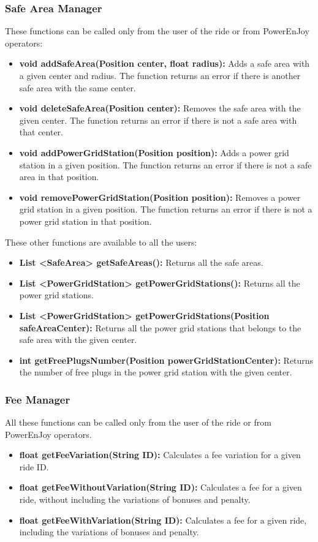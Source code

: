 \subsubsection{Safe Area Manager}
These functions can be called only from the user of the ride or from PowerEnJoy operators:
\begin{itemize}
	\item \textbf{void addSafeArea(Position center, float radius):} Adds a safe area with a given center and radius. The function returns an error if there is another safe area with the same center.
	\item \textbf{void deleteSafeArea(Position center):} Removes the safe area with the given center. The function returns an error if there is not a safe area with that center.
	\item \textbf{void addPowerGridStation(Position position):} Adds a power grid station in a given position. The function returns an error if there is not a safe area in that position.
	\item \textbf{void removePowerGridStation(Position position):} Removes a power grid station in a given position. The function returns an error if there is not a power grid station in that position.
\end{itemize}

These other functions are available to all the users:
\begin{itemize}
	\item \textbf{List \textless SafeArea\textgreater{} getSafeAreas():} Returns all the safe areas.
	\item \textbf{List \textless PowerGridStation\textgreater{} getPowerGridStations():} Returns all the power grid stations.
	\item \textbf{List \textless PowerGridStation\textgreater{} getPowerGridStations(Position safeAreaCenter):} Returns all the power grid stations that belongs to the safe area with the given center.
	\item \textbf{int getFreePlugsNumber(Position powerGridStationCenter):} Returns the number of free plugs in the power grid station with the given center.
\end{itemize}

\subsubsection{Fee Manager}
All these functions can be called only from the user of the ride or from PowerEnJoy operators.
\begin{itemize}
	\item \textbf{float getFeeVariation(String ID):} Calculates a fee variation for a given ride ID. 
	\item \textbf{float getFeeWithoutVariation(String ID):} Calculates a fee for a given ride, without including the variations of bonuses and penalty.
	\item \textbf{float getFeeWithVariation(String ID):} Calculates a fee for a given ride, including the variations of bonuses and penalty.
\end{itemize}

